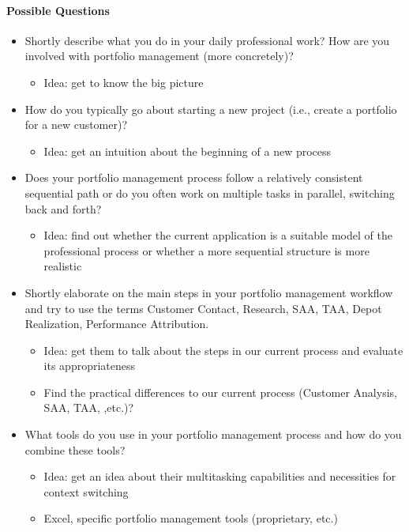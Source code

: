 \paragraph{Possible Questions}
\begin{itemize}
  \item Shortly describe what you do in your daily professional work? How are you involved with portfolio management (more concretely)?
  \begin{itemize}
    \item Idea: get to know the big picture
  \end{itemize}
  \item How do you typically go about starting a new project (i.e., create a portfolio for a new customer)?
  \begin{itemize}
    \item Idea: get an intuition about the beginning of a new process
  \end{itemize}
  \item Does your portfolio management process follow a relatively consistent sequential path or do you often work on multiple tasks in parallel, switching back and forth?
  \begin{itemize}
    \item Idea: find out whether the current application is a suitable model of the professional process or whether a more sequential structure is more realistic
  \end{itemize}
  \item   Shortly elaborate on the main steps in your portfolio management workflow and try to use the terms Customer Contact, Research, SAA, TAA, Depot Realization, Performance Attribution.
  \begin{itemize}
    \item Idea: get them to talk about the steps in our current process and evaluate its appropriateness
    \item Find the practical differences to our current process (Customer Analysis, SAA, TAA, ,etc.)?
  \end{itemize}
  \item What tools do you use in your portfolio management process and how do you combine these tools?
  \begin{itemize}
    \item Idea: get an idea about their multitasking capabilities and necessities for context switching
    \item Excel, specific portfolio management tools (proprietary, etc.)

\end{itemize}
\end{itemize}
